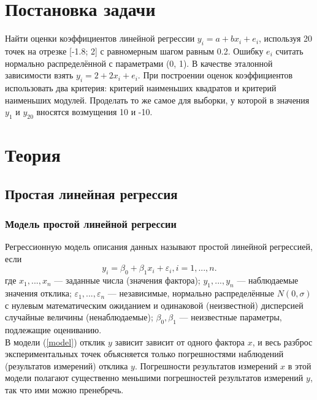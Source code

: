 
\usepackage{amsmath}




\renewcommand\contentsname{\centerline{Содержание}}
\tableofcontents
\newpage

\listoffigures
\newpage

\section{Постановка задачи}
Найти оценки коэффициентов линейной регрессии $y_i=a+bx_i+e_i$, используя 20 точек на отрезке [-1.8; 2] с равномерным шагом равным 0.2. Ошибку $e_i$ считать нормально распределённой с параметрами (0, 1). В качестве эталонной зависимости взять $y_i=2+2x_i+e_i$. При построении оценок коэффициентов использовать два критерия: критерий наименьших квадратов и критерий наименьших модулей. Проделать то же самое для выборки, у которой в значения $y_1$ и $y_{20}$ вносятся возмущения 10 и -10.

\section{Теория}
\subsection{Простая линейная регрессия}
\subsubsection{Модель простой линейной регрессии}
Регрессионную модель описания данных называют простой линейной регрессией, если
\begin{equation} \label{model}
y_i=\beta_0+\beta_1x_i+\varepsilon_i, i=1,...,n.
\end{equation}
где $x_1,...,x_n$ — заданные числа (значения фактора); $y_1,...,y_n$ — наблюдаемые значения отклика; $\varepsilon_1,...,\varepsilon_n$ — независимые, нормально распределённые $N(0,\sigma)$ с нулевым математическим ожиданием и одинаковой (неизвестной) дисперсией случайные величины (ненаблюдаемые); $\beta_0, \beta_1$ — неизвестные параметры, подлежащие оцениванию.\\
В модели (\ref{model}) отклик $y$ зависит зависит от одного фактора $x$, и весь разброс экспериментальных точек объясняется только погрешностями наблюдений (результатов измерений) отклика $y$. Погрешности результатов измерений $x$ в этой модели полагают существенно меньшими погрешностей результатов измерений $y$, так что ими можно пренебречь.

